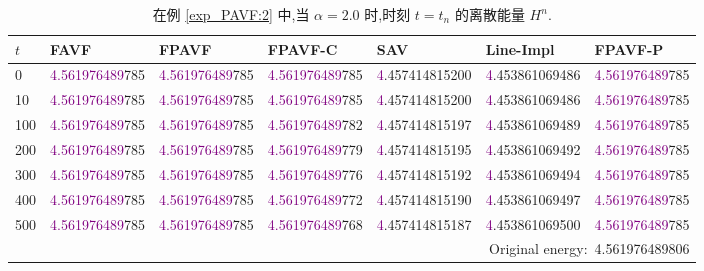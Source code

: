\documentclass[aspectratio=169]{beamer}
\numberwithin{theorem}{section} %
\numberwithin{equation}{section}%
\numberwithin{figure}{section}%
\numberwithin{table}{section}%
\begin{document}
\begin{frame}%

	\begin{table}[H]\tiny
		\centering
		\caption{在例 \ref{exp_PAVF:2} 中,当 $\alpha=2.0$ 时,时刻 $t=t_n$ 的离散能量 $H^n$.}
	
		  \begin{tabular}{lllllll}
		  \toprule
		   $t$   &FAVF   &FPAVF   &FPAVF-C   &SAV    &Line-Impl   &FPAVF-P\\
		  \midrule
		  0     &\textcolor{purple}{4.561976489}785   &\textcolor{purple}{4.561976489}785   &\textcolor{purple}{4.561976489}785   &\textcolor{purple}{4}.457414815200   &\textcolor{purple}{4}.453861069486   &\textcolor{purple}{4.561976489}785 \\
		  10    &\textcolor{purple}{4.561976489}785   &\textcolor{purple}{4.561976489}785   &\textcolor{purple}{4.561976489}785   &\textcolor{purple}{4}.457414815200   &\textcolor{purple}{4}.453861069486   &\textcolor{purple}{4.561976489}785 \\
		  100   &\textcolor{purple}{4.561976489}785   &\textcolor{purple}{4.561976489}785   &\textcolor{purple}{4.561976489}782   &\textcolor{purple}{4}.457414815197   &\textcolor{purple}{4}.453861069489   &\textcolor{purple}{4.561976489}785 \\
		  200   &\textcolor{purple}{4.561976489}785   &\textcolor{purple}{4.561976489}785   &\textcolor{purple}{4.561976489}779   &\textcolor{purple}{4}.457414815195   &\textcolor{purple}{4}.453861069492   &\textcolor{purple}{4.561976489}785 \\
		  300   &\textcolor{purple}{4.561976489}785   &\textcolor{purple}{4.561976489}785   &\textcolor{purple}{4.561976489}776   &\textcolor{purple}{4}.457414815192   &\textcolor{purple}{4}.453861069494   &\textcolor{purple}{4.561976489}785 \\
		  400   &\textcolor{purple}{4.561976489}785   &\textcolor{purple}{4.561976489}785   &\textcolor{purple}{4.561976489}772   &\textcolor{purple}{4}.457414815190   &\textcolor{purple}{4}.453861069497   &\textcolor{purple}{4.561976489}785 \\
		  500   &\textcolor{purple}{4.561976489}785   &\textcolor{purple}{4.561976489}785   &\textcolor{purple}{4.561976489}768   &\textcolor{purple}{4}.457414815187   &\textcolor{purple}{4}.453861069500   &\textcolor{purple}{4.561976489}785 \\
		  \midrule
		  \multicolumn{7}{r}{Original energy:~4.561976489806} \\
		  \bottomrule
		  \end{tabular}\label{tab_PAVF:1}%
	  \end{table}%
	

\end{frame}
\end{document}
